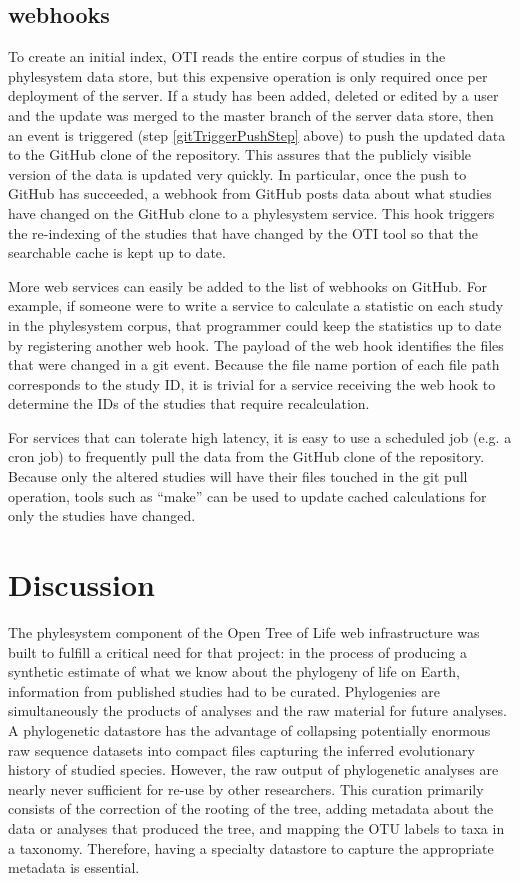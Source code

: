 \documentclass{bioinfo}
\newcommand{\ps}{phylesystem\xspace}
\newcommand{\otol}{Open Tree of Life\xspace}
\begin{document}
\begin{methods}
\subsection*{webhooks}
To create an initial index, OTI reads the entire corpus of studies in the \ps data store, but this expensive operation
    is only required once per deployment of the server.
If a study has been added, deleted or edited by a user and the update was merged to the master branch of the server data store,
    then an event is triggered (step \ref{gitTriggerPushStep} above) to push the updated data to the GitHub clone
    of the repository.
This assures that the publicly visible version of the data is updated very quickly.
In particular, once the push to GitHub has succeeded, a webhook from GitHub posts data about what studies have changed
    on the GitHub clone to a \ps service.
This hook triggers the re-indexing of the studies that have changed by the OTI tool so that the searchable cache is
    kept up to date.

More web services can easily be added to the list of webhooks on GitHub.
For example, if someone were to write a service to calculate a statistic on each study in the \ps corpus, that
    programmer could keep the statistics up to date by registering another web hook.
The payload of the web hook identifies the files that were changed in a git event.
Because the file name portion of each file path corresponds to the study ID, it is trivial for a service
    receiving the web hook to determine the IDs of the studies that require recalculation.

For services that can tolerate high latency, it is easy to use a scheduled job (e.g. a cron job) to 
    frequently pull the data from the GitHub clone of the repository.
Because only the altered studies will have their files touched in the git pull operation, tools such
    as ``make'' can be used to update cached calculations for only the studies have changed.
\end{methods}

\section{Discussion}
The \ps component of the \otol web infrastructure was built to fulfill a critical need for that
    project: in the process of producing a synthetic estimate of what we know about the phylogeny
    of life on Earth, information from published studies had to be curated.
Phylogenies are simultaneously the products of analyses and the raw material for future analyses.
A phylogenetic datastore has the advantage of collapsing potentially enormous raw sequence datasets
  into compact files capturing the inferred evolutionary history of studied species.
However, the raw output of phylogenetic analyses are nearly never sufficient for re-use by other researchers. 
This curation primarily consists of the correction of the rooting of the tree, adding metadata about the data
    or analyses that produced the tree, and mapping the OTU labels to taxa in a taxonomy.
Therefore, having a specialty datastore to capture the appropriate metadata is essential.
\end{document}
